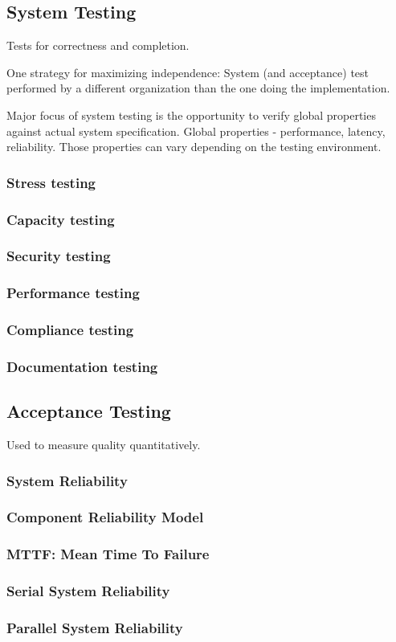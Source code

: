 \documentclass{article}
\begin{document}
\subsection{System Testing}
Tests for correctness and completion.

One strategy for maximizing independence:
System (and acceptance) test performed by a different organization than the one doing the implementation.

Major focus of system testing is the opportunity to verify global properties against actual system specification. Global properties - performance, latency, reliability. Those properties can vary depending on the testing environment.


\subsubsection{Stress testing}
\subsubsection{Capacity testing}
\subsubsection{Security testing}
\subsubsection{Performance testing}
\subsubsection{Compliance testing}
\subsubsection{Documentation testing}

\subsection{Acceptance Testing}
Used to measure quality quantitatively.
\subsubsection{System Reliability}
\subsubsection{Component Reliability Model}
\subsubsection{MTTF: Mean Time To Failure}
\subsubsection{Serial System Reliability}
\subsubsection{Parallel System Reliability}
\end{document}
